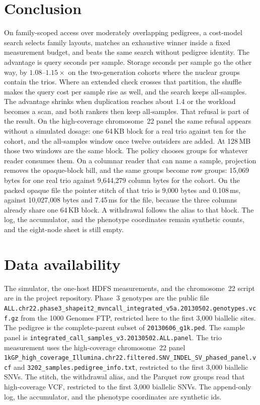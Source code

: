 \documentclass[11pt]{article}
\begin{document}
\section{Conclusion}

On family-scoped access over moderately overlapping pedigrees, a cost-model search selects family layouts, matches an exhaustive winner inside a fixed measurement budget, and beats the same search without pedigree identity.
The advantage is query seconds per sample.
Storage seconds per sample go the other way, by $1.08$--$1.15\times$ on the two-generation cohorts where the nuclear groups contain the trios.
Where an extended check crosses that partition, the shuffle makes the query cost per sample rise as well, and the search keeps all-samples.
The advantage shrinks when duplication reaches about 1.4 or the workload becomes a scan, and both rankers then keep all-samples.
That refusal is part of the result.
On the high-coverage chromosome~22 panel the same refusal appears without a simulated dosage: one 64\,KB block for a real trio against ten for the cohort, and the all-samples window once twelve outsiders are added.
At 128\,MB those two windows are the same block.
The policy chooses groups for whatever reader consumes them.
On a columnar reader that can name a sample, projection removes the opaque-block bill, and the same groups become row groups: 15{,}069 bytes for one real trio against 9{,}644{,}279 column bytes for the cohort.
On the packed opaque file the pointer stitch of that trio is 9{,}000 bytes and 0.108\,ms, against 10{,}027{,}008 bytes and 7.45\,ms for the file, because the three columns already share one 64\,KB block.
A withdrawal follows the alias to that block.
The log, the accumulator, and the phenotype coordinates remain synthetic counts, and the eight-node sheet is still empty.

\section*{Data availability}
The simulator, the one-host HDFS measurements, and the chromosome~22 script are in the project repository.
Phase~3 genotypes are the public file
\texttt{ALL.chr22.phase3\_shapeit2\_mvncall\_integrated\_v5a.20130502.genotypes.vcf.gz}
from the 1000 Genomes FTP, restricted here to the first 3{,}000 biallelic sites.
The pedigree is the complete-parent subset of \texttt{20130606\_g1k.ped}.
The sample panel is \texttt{integrated\_call\_samples\_v3.20130502.ALL.panel}.
The trio measurement uses the high-coverage chromosome~22 panel
\texttt{1kGP\_high\_coverage\_Illumina.chr22.filtered.SNV\_INDEL\_SV\_phased\_panel.vcf}
and \texttt{3202\_samples.pedigree\_info.txt}, restricted to the first 3{,}000 biallelic SNVs.
The stitch, the withdrawal alias, and the Parquet row groups read that high-coverage VCF, restricted to the first 3{,}000 biallelic SNVs.
The append-only log, the accumulator, and the phenotype coordinates are synthetic ids.

\printbibliography
\end{document}
